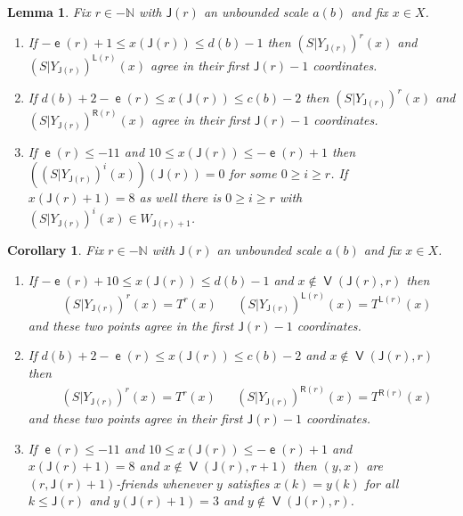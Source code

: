 \documentclass[10pt]{amsart}
\newtheorem{lemm}[theo]{Lemma}\newtheorem{prop}[theo]{Proposition}\newtheorem{coro}[theo]{Corollary}\newtheorem{conj}[theo]{Conjecture}
\theoremstyle{definition}\newtheorem{defi}[theo]{Definition}\newtheorem{rema}[theo]{Remark}\newtheorem{exam}[theo]{Example}\newtheorem{exem}[theo]{Example}\newtheorem{nota}[theo]{Notation}
\DeclareMathOperator{\lst}{\mathsf{e}}
\DeclareMathOperator{\bad}{\mathsf{V}}
\newcommand{\N}{\mathbb{N}}
\newcommand{\lft}{\mathsf{L}}
\newcommand{\rht}{\mathsf{R}}
\newcommand{\scl}{\mathsf{J}}
\begin{document}
\begin{lemm}\label{lem:reduction negative}
Fix $r \in -\N$ with $\scl(r)$ an unbounded scale $a(b)$ and fix $x \in X$.
\begin{enumerate}
\item\label{lem:neg red S left}
If $-\lst(r)+1 \le x(\scl(r)) \le d(b) -1$ then $(S|Y_{\scl(r)})^r(x)$ and $(S|Y_{\scl(r)})^{\lft(r)}(x)$ agree in their first $\scl(r) - 1$ coordinates.
\item\label{lem:neg red S right}
If $d(b) + 2 - \lst(r) \le x(\scl(r)) \le c(b)-2$ then $(S|Y_{\scl(r)})^r(x)$ and $(S|Y_{\scl(r)})^{\rht(r)}(x)$ agree in their first $\scl(r)-1$ coordinates.
\item\label{lem: neg red S bdd}
If $\lst(r) \leq -11$ and $10 \le x(\scl(r)) \le -\lst(r) + 1$ then $((S|Y_{\scl(r)})^i(x))(\scl(r)) = 0$ for some $0 \ge i \ge r$. If $x(\scl(r) + 1) = 8$ as well there is $0 \ge i \ge r$ with $(S|Y_{\scl(r)})^i(x) \in W_{\scl(r) + 1}$.
\end{enumerate}
\end{lemm}


\begin{coro}\label{cor:neg reduc conseq}
Fix $r \in -\N$ with $\scl(r)$ an unbounded scale $a(b)$ and fix $x \in X$.
\begin{enumerate}
\item\label{cor:neg red T left}
If $- \lst(r) + 10 \le x(\scl(r)) \le d(b)-1$ and $x \notin \bad(\scl(r),r)$ then
\begin{align*}
&(S|Y_{\scl(r)})^r(x) = T^r(x)
&&(S|Y_{\scl(r)})^{\lft(r)}(x) = T^{\lft(r)}(x)
\end{align*}
and these two points agree in the first $\scl(r)-1$ coordinates.
\item\label{cor:neg red T right}
If $d(b) + 2 - \lst(r) \le x(\scl(r)) \le c(b)-2$ and $x \notin \bad(\scl(r),r)$ then
\begin{align*}
&(S|Y_{\scl(r)})^r(x)=T^r(x)
&&(S|Y_{\scl(r)})^{\rht(r)}(x)=T^{\rht(r)}(x)
\end{align*}
and these two points agree in their first $\scl(r)-1$ coordinates.
\item\label{conc:neg reduc friends}
If $\lst(r) \leq -11$ and $10 \le x(\scl(r)) \le -\lst(r) + 1$ and $x(\scl(r)+1) = 8$ and $x \notin \bad(\scl(r),r+1)$ then $(y,x)$ are $(r,\scl(r) + 1)$-friends whenever $y$ satisfies $x(k) = y(k)$ for all $k \le \scl(r)$ and $y(\scl(r) + 1) = 3$ and $y \notin \bad(\scl(r),r)$.
\end{enumerate}
\end{coro}
\end{document}
